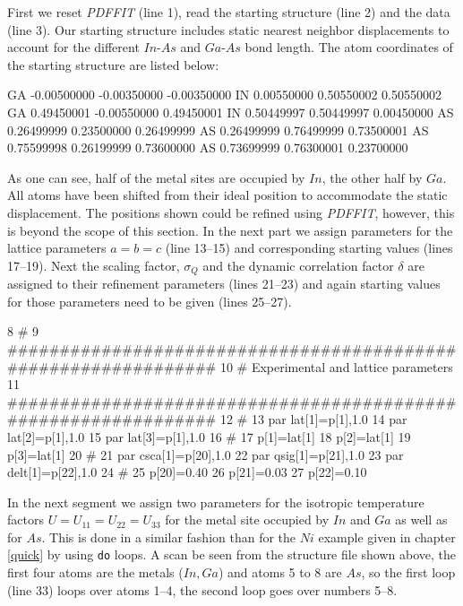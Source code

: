 \noindent First we reset {\it PDFFIT} (line 1), read the starting
structure (line 2) and the data (line 3). Our starting structure
includes static nearest neighbor displacements to account for the
different $In$-$As$ and $Ga$-$As$ bond length. The atom
coordinates of the starting structure are listed below:

\footnotesize
\begin{MacVerbatim}
   GA         -0.00500000       -0.00350000       -0.00350000
   IN          0.00550000        0.50550002        0.50550002
   GA          0.49450001       -0.00550000        0.49450001
   IN          0.50449997        0.50449997        0.00450000
   AS          0.26499999        0.23500000        0.26499999
   AS          0.26499999        0.76499999        0.73500001
   AS          0.75599998        0.26199999        0.73600000
   AS          0.73699999        0.76300001        0.23700000
\end{MacVerbatim}
\normalsize

\noindent As one can see, half of the metal sites are occupied by
$In$, the other half by $Ga$. All atoms have been shifted from
their ideal position to accommodate the static displacement. The
positions shown could be refined using {\it PDFFIT}, however, this
is beyond the scope of this section. In the next part we assign
parameters for the lattice parameters $a=b=c$ (line 13--15) and
corresponding starting values (lines 17--19). Next the scaling
factor, $\sigma_{Q}$ and the dynamic correlation factor $\delta$
are assigned to their refinement parameters (lines 21--23) and
again starting values for those parameters need to be given (lines
25--27).

\footnotesize
\begin{MacVerbatim}
      8 #
      9 ###############################################################
     10 # Experimental and lattice parameters
     11 ###############################################################
     12 #
     13 par lat[1]=p[1],1.0
     14 par lat[2]=p[1],1.0
     15 par lat[3]=p[1],1.0
     16 #
     17 p[1]=lat[1]
     18 p[2]=lat[1]
     19 p[3]=lat[1]
     20 #
     21 par csca[1]=p[20],1.0
     22 par qsig[1]=p[21],1.0
     23 par delt[1]=p[22],1.0
     24 #
     25 p[20]=0.40
     26 p[21]=0.03
     27 p[22]=0.10
\end{MacVerbatim}
\normalsize

\noindent In the next segment we assign two parameters for the
isotropic temperature factors $U=U_{11}=U_{22}=U_{33}$ for the
metal site occupied by $In$ and $Ga$ as well as for $As$. This is
done in a similar fashion than for the $Ni$ example given in
chapter \ref{quick} by using {\tt do} loops. A scan be seen from
the structure file shown above, the first four atoms are the
metals ($In,Ga$) and atoms 5 to 8 are $As$, so the first loop
(line 33) loops over atoms 1--4, the second loop goes over numbers
5--8.

